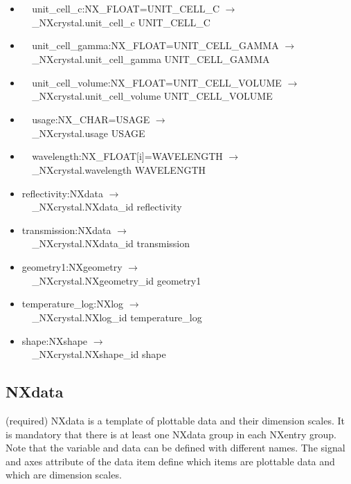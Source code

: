 \documentclass[11pt]{article}
\begin{document}
{{\begin{itemize}
\item{\verb|  |unit\_cell\_c:NX\_FLOAT=UNIT\_CELL\_C $\rightarrow$\\
\verb|  |\_NXcrystal.unit\_cell\_c UNIT\_CELL\_C}

\item{\verb|  |unit\_cell\_gamma:NX\_FLOAT=UNIT\_CELL\_GAMMA $\rightarrow$\\
\verb|  |\_NXcrystal.unit\_cell\_gamma UNIT\_CELL\_GAMMA}

\item{\verb|  |unit\_cell\_volume:NX\_FLOAT=UNIT\_CELL\_VOLUME $\rightarrow$\\
\verb|  |\_NXcrystal.unit\_cell\_volume UNIT\_CELL\_VOLUME}

\item{\verb|  |usage:NX\_CHAR=USAGE $\rightarrow$\\
\verb|  |\_NXcrystal.usage USAGE}

\item{\verb|  |wavelength:NX\_FLOAT[i]=WAVELENGTH $\rightarrow$\\
\verb|  |\_NXcrystal.wavelength WAVELENGTH}

\item{reflectivity:NXdata $\rightarrow$\\
\verb|  |\_NXcrystal.NXdata\_id reflectivity}

\item{transmission:NXdata $\rightarrow$\\
\verb|  |\_NXcrystal.NXdata\_id transmission}

\item{geometry1:NXgeometry $\rightarrow$\\
\verb|  |\_NXcrystal.NXgeometry\_id geometry1}

\item{temperature\_log:NXlog $\rightarrow$\\
\verb|  |\_NXcrystal.NXlog\_id temperature\_log}

\item{shape:NXshape $\rightarrow$\\
\verb|  |\_NXcrystal.NXshape\_id shape}
\end{itemize}
\subsection{NXdata}

(required) NXdata is a template of plottable data and their dimension scales. It is mandatory that there is at least one NXdata group in each NXentry group. Note that the variable and data can be defined with different names. The signal and axes attribute of the data item define which items are plottable data and which are dimension scales.

}}
\end{document}
